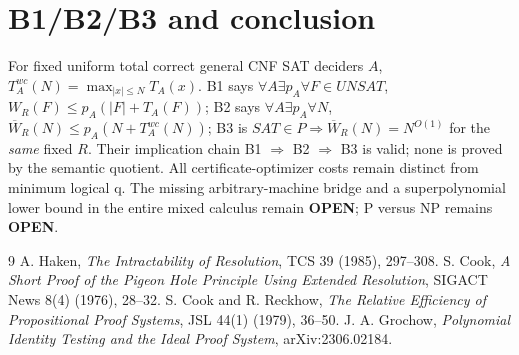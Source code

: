 \documentclass[11pt]{article}
\begin{document}
\section*{B1/B2/B3 and conclusion}
\noindent For fixed uniform total correct general CNF SAT deciders $A$, $T_A^{wc}(N)=\max_{|x|\le N}T_A(x)$. B1 says $\forall A\exists p_A\forall F\in UNSAT$, $W_R(F)\le p_A(|F|+T_A(F))$; B2 says $\forall A\exists p_A\forall N$, $\overline W_R(N)\le p_A(N+T_A^{wc}(N))$; B3 is $SAT\in P\Rightarrow\overline W_R(N)=N^{O(1)}$ for the \emph{same} fixed $R$. Their implication chain B1 $\Rightarrow$ B2 $\Rightarrow$ B3 is valid; none is proved by the semantic quotient. All certificate-optimizer costs remain distinct from minimum logical q. The missing arbitrary-machine bridge and a superpolynomial lower bound in the entire mixed calculus remain \textbf{OPEN}; P versus NP remains \textbf{OPEN}.

\begin{thebibliography}{9}
 A. Haken, \emph{The Intractability of Resolution}, TCS 39 (1985), 297--308.
 S. Cook, \emph{A Short Proof of the Pigeon Hole Principle Using Extended Resolution}, SIGACT News 8(4) (1976), 28--32.
 S. Cook and R. Reckhow, \emph{The Relative Efficiency of Propositional Proof Systems}, JSL 44(1) (1979), 36--50.
 J. A. Grochow, \emph{Polynomial Identity Testing and the Ideal Proof System}, arXiv:2306.02184.
\end{thebibliography}
\end{document}
